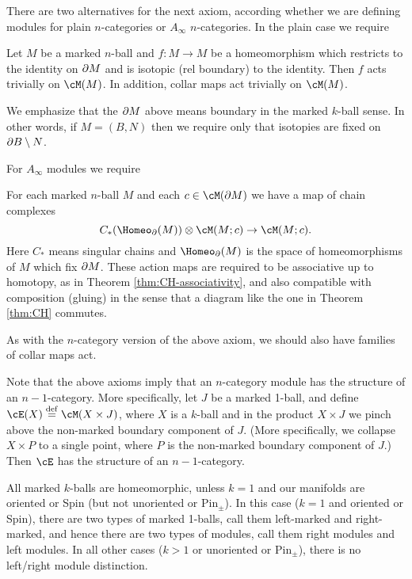 \medskip

There are two alternatives for the next axiom, according whether we are defining
modules for plain $n$-categories or $A_\infty$ $n$-categories.
In the plain case we require

\begin{module-axiom}
{Let $M$ be a marked $n$-ball and $f: M\to M$ be a homeomorphism which restricts
to the identity on $\partial M$ and is isotopic (rel boundary) to the identity.
Then $f$ acts trivially on $\cM(M)$.}
In addition, collar maps act trivially on $\cM(M)$.
\end{module-axiom}

We emphasize that the $\partial M$ above means boundary in the marked $k$-ball sense.
In other words, if $M = (B, N)$ then we require only that isotopies are fixed 
on $\partial B \setminus N$.

For $A_\infty$ modules we require

\addtocounter{module-axiom}{-1}
\begin{module-axiom}
For each marked $n$-ball $M$ and each $c\in \cM(\bd M)$ we have a map of chain complexes
\[
	C_*(\Homeo_\bd(M))\ot \cM(M; c) \to \cM(M; c) .
\]
Here $C_*$ means singular chains and $\Homeo_\bd(M)$ is the space of homeomorphisms of $M$
which fix $\partial M$.
These action maps are required to be associative up to homotopy, as in Theorem \ref{thm:CH-associativity}, 
and also compatible with composition (gluing) in the sense that
a diagram like the one in Theorem \ref{thm:CH} commutes.
\end{module-axiom}

As with the $n$-category version of the above axiom, we should also have families of collar maps act.

\medskip

Note that the above axioms imply that an $n$-category module has the structure
of an $n{-}1$-category.
More specifically, let $J$ be a marked 1-ball, and define $\cE(X)\deq \cM(X\times J)$,
where $X$ is a $k$-ball and in the product $X\times J$ we pinch 
above the non-marked boundary component of $J$.
(More specifically, we collapse $X\times P$ to a single point, where
$P$ is the non-marked boundary component of $J$.)
Then $\cE$ has the structure of an $n{-}1$-category.

All marked $k$-balls are homeomorphic, unless $k = 1$ and our manifolds
are oriented or Spin (but not unoriented or $\text{Pin}_\pm$).
In this case ($k=1$ and oriented or Spin), there are two types
of marked 1-balls, call them left-marked and right-marked,
and hence there are two types of modules, call them right modules and left modules.
In all other cases ($k>1$ or unoriented or $\text{Pin}_\pm$),
there is no left/right module distinction.

